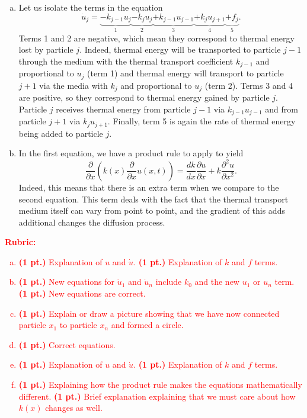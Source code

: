 \documentclass[12pt]{article} %
\begin{document}
\begin{solution}
\begin{enumerate}[(a)]
    \item Let us isolate the terms in the equation
\[
\dot{u}_j = \underbrace{-k_{j-1}u_j}_1 \underbrace{- k_{j} u_j}_2 \underbrace{+ k_{j-1}u_{j-1}}_3 \underbrace{+ k_{j} u_{j+1}}_4 \underbrace{+ f_j}_5.
\]
Terms 1 and 2 are negative, which mean they correspond to thermal energy lost by particle $j$. Indeed, thermal energy will be transported to particle $j-1$ through the medium with the thermal transport coefficient $k_{j-1}$ and proportional to $u_{j}$ (term 1) and thermal energy will transport to particle $j+1$ via the media with $k_j$ and proportional to $u_j$ (term 2). Terms 3 and 4 are positive, so they correspond to thermal energy gained by particle $j$. Particle $j$ receives thermal energy from particle $j-1$ via $k_{j-1}u_{j-1}$ and from particle $j+1$ via $k_j u_{j+1}$. Finally, term 5 is again the rate of thermal energy being added to particle $j$.

\item In the first equation, we have a product rule to apply to yield
\[
\frac{\partial}{\partial x} \left( k(x)\frac{\partial}{\partial x} u(x,t) \right) = \frac{d k}{dx} \frac{\partial u}{\partial x} + k \frac{\partial^2 u}{\partial x^2}.
\]
Indeed, this means that there is an extra term when we compare to the second equation. This term deals with the fact that the thermal transport medium itself can vary from point to point, and the gradient of this adds additional changes the diffusion process.
\end{enumerate}
\end{solution}
\vspace*{1cm}
\textcolor{red}{
\noindent \textbf{Rubric:}
\begin{enumerate}[(a)]
    \item \textbf{(1 pt.)} Explanation of $u$ and $\dot{u}$. \textbf{(1 pt.)} Explanation of $k$ and $f$ terms.
	\item \textbf{(1 pt.)} New equations for $\dot{u}_1$ and $\dot{u}_n$ include $k_0$ and the new $u_1$ or $u_n$ term. \textbf{(1 pt.)} New equations are correct.
    \item \textbf{(1 pt.)} Explain or draw a picture showing that we have now connected particle $x_1$ to particle $x_n$ and formed a circle.
	\item \textbf{(1 pt.)} Correct equations.
	\item  \textbf{(1 pt.)} Explanation of $u$ and $\dot{u}$. \textbf{(1 pt.)} Explanation of $k$ and $f$ terms.
	\item  \textbf{(1 pt.)} Explaining how the product rule makes the equations mathematically different. \textbf{(1 pt.)} Brief explanation explaining that we must care about how $k(x)$ changes as well.
\end{enumerate}
}
\end{document}
